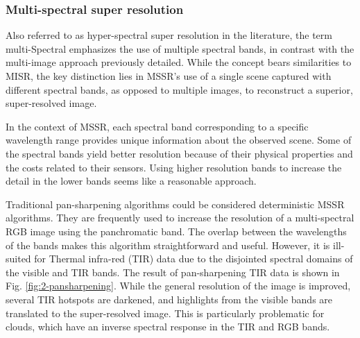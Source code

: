         \subsubsection{Multi-spectral super resolution}

        Also referred to as hyper-spectral super resolution in the literature, the term multi-Spectral emphasizes the use of multiple spectral bands, in contrast with the multi-image approach previously detailed. While the concept bears similarities to MISR, the key distinction lies in MSSR's use of a single scene captured with different spectral bands, as opposed to multiple images, to reconstruct a superior, super-resolved image.

        In the context of MSSR, each spectral band corresponding to a specific wavelength range provides unique information about the observed scene. Some of the spectral bands yield better resolution because of their physical properties and the costs related to their sensors. Using higher resolution bands to increase the detail in the lower bands seems like a reasonable approach.

        Traditional pan-sharpening algorithms could be considered deterministic MSSR  algorithms. They are frequently used to increase the resolution of a multi-spectral RGB image using the panchromatic band. The overlap between the wavelengths of the bands makes this algorithm straightforward and useful. However, it is ill-suited for Thermal infra-red (TIR) data due to the disjointed spectral domains of the visible and TIR bands.
        The result of pan-sharpening TIR data is shown in Fig. \ref{fig:2-pansharpening}.  While the general resolution of the image is improved, several TIR hotspots are darkened, and highlights from the visible bands are translated to the super-resolved image. This is particularly problematic for clouds, which have an inverse spectral response in the TIR and RGB bands. 
        
